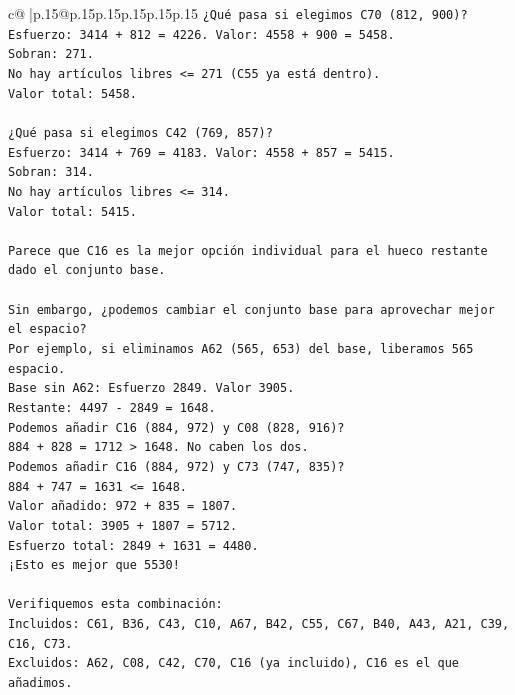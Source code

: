 \documentclass{article}
\begin{document}
{\begin{supertabular}{c@{$\;$}|p{.15\linewidth}@{}p{.15\linewidth}p{.15\linewidth}p{.15\linewidth}p{.15\linewidth}p{.15\linewidth}}
{{{\texttt{¿Qué pasa si elegimos C70 (812, 900)?} \\
\texttt{Esfuerzo: 3414 + 812 = 4226. Valor: 4558 + 900 = 5458.} \\
\texttt{Sobran: 271.} \\
\texttt{No hay artículos libres <= 271 (C55 ya está dentro).} \\
\texttt{Valor total: 5458.} \\
\\ 
\texttt{¿Qué pasa si elegimos C42 (769, 857)?} \\
\texttt{Esfuerzo: 3414 + 769 = 4183. Valor: 4558 + 857 = 5415.} \\
\texttt{Sobran: 314.} \\
\texttt{No hay artículos libres <= 314.} \\
\texttt{Valor total: 5415.} \\
\\ 
\texttt{Parece que C16 es la mejor opción individual para el hueco restante dado el conjunto base.} \\
\\ 
\texttt{Sin embargo, ¿podemos cambiar el conjunto base para aprovechar mejor el espacio?} \\
\texttt{Por ejemplo, si eliminamos A62 (565, 653) del base, liberamos 565 espacio.} \\
\texttt{Base sin A62: Esfuerzo 2849. Valor 3905.} \\
\texttt{Restante: 4497 {-} 2849 = 1648.} \\
\texttt{Podemos añadir C16 (884, 972) y C08 (828, 916)?} \\
\texttt{884 + 828 = 1712 > 1648. No caben los dos.} \\
\texttt{Podemos añadir C16 (884, 972) y C73 (747, 835)?} \\
\texttt{884 + 747 = 1631 <= 1648.} \\
\texttt{Valor añadido: 972 + 835 = 1807.} \\
\texttt{Valor total: 3905 + 1807 = 5712.} \\
\texttt{Esfuerzo total: 2849 + 1631 = 4480.} \\
\texttt{¡Esto es mejor que 5530!} \\
\\ 
\texttt{Verifiquemos esta combinación:} \\
\texttt{Incluidos: C61, B36, C43, C10, A67, B42, C55, C67, B40, A43, A21, C39, C16, C73.} \\
\texttt{Excluidos: A62, C08, C42, C70, C16 (ya incluido), C16 es el que añadimos.} \\
}}}
\end{supertabular}}
\end{document}
